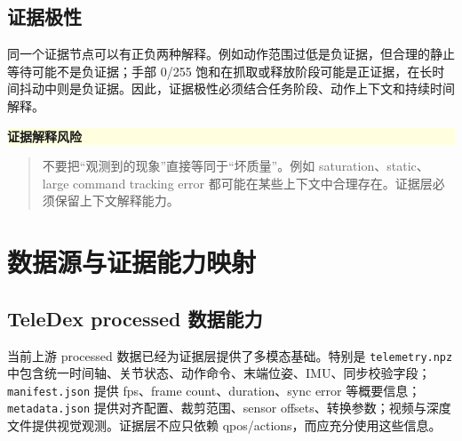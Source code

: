 \documentclass[UTF8,zihao=-4]{ctexart}
\newcommand{\Code}[1]{\texttt{#1}}
\newenvironment{warningbox}[1]{\vspace{0.5em}\noindent\colorbox{LightYellow}{\parbox{0.96\linewidth}{\textbf{#1}}}\par\vspace{-0.2em}\begin{quote}\small}{\end{quote}\vspace{0.3em}}
\begin{document}
\subsection{证据极性}

同一个证据节点可以有正负两种解释。例如动作范围过低是负证据，但合理的静止等待可能不是负证据；手部 0/255 饱和在抓取或释放阶段可能是正证据，在长时间抖动中则是负证据。因此，证据极性必须结合任务阶段、动作上下文和持续时间解释。

\begin{warningbox}{证据解释风险}
不要把“观测到的现象”直接等同于“坏质量”。例如 saturation、static、large command tracking error 都可能在某些上下文中合理存在。证据层必须保留上下文解释能力。
\end{warningbox}

\section{数据源与证据能力映射}

\subsection{TeleDex processed 数据能力}

当前上游 processed 数据已经为证据层提供了多模态基础。特别是 \Code{telemetry.npz} 中包含统一时间轴、关节状态、动作命令、末端位姿、IMU、同步校验字段；\Code{manifest.json} 提供 fps、frame count、duration、sync error 等概要信息；\Code{metadata.json} 提供对齐配置、裁剪范围、sensor offsets、转换参数；视频与深度文件提供视觉观测。证据层不应只依赖 qpos/actions，而应充分使用这些信息。
\end{document}

